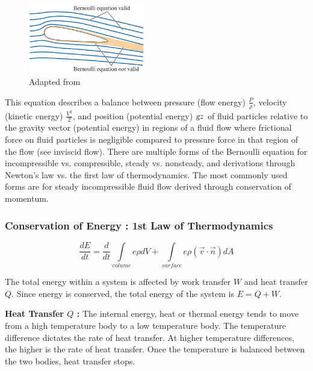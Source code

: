 \documentclass{article}
\begin{document}
\begin{figure}[h!]
\centering
\includegraphics[width=0.45\textwidth]{./img/bermoulliInviscidRegions.png}
\caption{Adapted from \cite{White2011}}
\label{fig:universe}
\end{figure}

This equation describes a balance between pressure (flow energy) $\displaystyle \frac{P}{\rho}$, velocity (kinetic energy) $\displaystyle \frac{V^2}{2}$, and position (potential energy) $\textsl{g} z$ of fluid particles relative to the gravity vector (potential energy) in regions of a fluid flow where frictional force on fluid particles is negligible compared to pressure force in that region of the flow (see inviscid flow). There are multiple forms of the Bernoulli equation for incompressible vs. compressible, steady vs. nonsteady, and derivations through Newton’s law vs. the first law of thermodynamics. The most commonly used forms are for steady incompressible fluid flow derived through conservation of momentum.



\subsubsection*{Conservation of Energy : 1st Law of Thermodynamics}

\begin{equation}
\frac{d E}{d t} = \frac{d}{d t} \int\limits_{volume} e \rho dV + \int\limits_{surface} e \rho (\vec{v} \cdot \vec{n}) dA
\label{eq_conservationOfEnergy}
\end{equation}

The total energy within a system is affected by work transfer $W$ and heat transfer $Q$. Since energy is conserved, the total energy of the system is $\displaystyle E = Q + W$. \cite{Moukalled2016, White2011}

\textbf{Heat Transfer $Q$ :} The internal energy, heat or thermal energy tends to move from a high temperature body to a low temperature body. The temperature difference dictates the rate of heat transfer. At higher temperature differences, the higher is the rate of heat transfer. Once the temperature is balanced between the two bodies, heat transfer stops.
\end{document}
